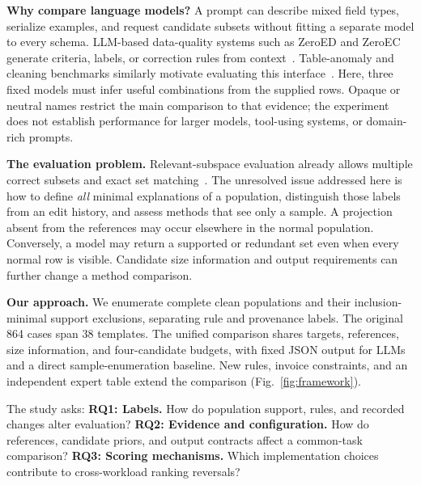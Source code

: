 \documentclass[conference]{IEEEtran}
\begin{document}
\textbf{Why compare language models?} A prompt can describe mixed field types, serialize examples, and request candidate subsets without fitting a separate model to every schema. LLM-based data-quality systems such as ZeroED and ZeroEC generate criteria, labels, or correction rules from context~\cite{ni2025zeroed,wu2025zeroec}. Table-anomaly and cleaning benchmarks similarly motivate evaluating this interface~\cite{choudhury2025tabard,gu2025radar,li2025autodcworkflow}. Here, three fixed models must infer useful combinations from the supplied rows. Opaque or neutral names restrict the main comparison to that evidence; the experiment does not establish performance for larger models, tool-using systems, or domain-rich prompts.

\textbf{The evaluation problem.} Relevant-subspace evaluation already allows multiple correct subsets and exact set matching~\cite{myrtakis2021comparative}. The unresolved issue addressed here is how to define \emph{all} minimal explanations of a population, distinguish those labels from an edit history, and assess methods that see only a sample. A projection absent from the references may occur elsewhere in the normal population. Conversely, a model may return a supported or redundant set even when every normal row is visible. Candidate size information and output requirements can further change a method comparison.

\textbf{Our approach.} We enumerate complete clean populations and their inclusion-minimal support exclusions, separating rule and provenance labels. The original 864 cases span 38 templates. The unified comparison shares targets, references, size information, and four-candidate budgets, with fixed JSON output for LLMs and a direct sample-enumeration baseline. New rules, invoice constraints, and an independent expert table extend the comparison (Fig.~\ref{fig:framework}).

The study asks: \textbf{RQ1: Labels.} How do population support, rules, and recorded changes alter evaluation? \textbf{RQ2: Evidence and configuration.} How do references, candidate priors, and output contracts affect a common-task comparison? \textbf{RQ3: Scoring mechanisms.} Which implementation choices contribute to cross-workload ranking reversals?
\end{document}

